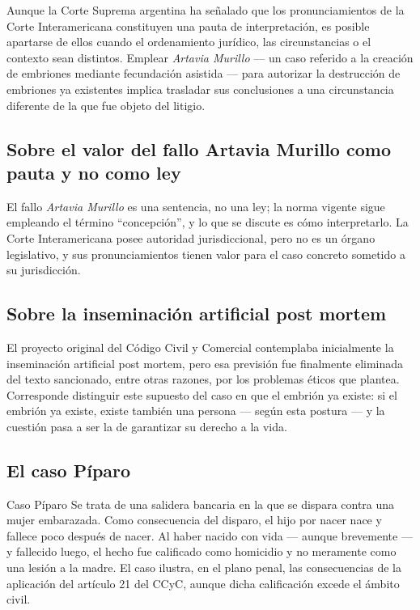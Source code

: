 \documentclass[12pt,oneside]{book}
\begin{document}
\begin{important}
Aunque la Corte Suprema argentina ha señalado que los pronunciamientos de la Corte Interamericana constituyen una pauta de interpretación, es posible apartarse de ellos cuando el ordenamiento jurídico, las circunstancias o el contexto sean distintos. Emplear \textit{Artavia Murillo} --- un caso referido a la creación de embriones mediante fecundación asistida --- para autorizar la destrucción de embriones ya existentes implica trasladar sus conclusiones a una circunstancia diferente de la que fue objeto del litigio.
\end{important}

\subsection{Sobre el valor del fallo Artavia Murillo como pauta y no como ley}

El fallo \textit{Artavia Murillo} es una sentencia, no una ley; la norma vigente sigue empleando el término ``concepción'', y lo que se discute es cómo interpretarlo. La Corte Interamericana posee autoridad jurisdiccional, pero no es un órgano legislativo, y sus pronunciamientos tienen valor para el caso concreto sometido a su jurisdicción.

\subsection{Sobre la inseminación artificial post mortem}

El proyecto original del Código Civil y Comercial contemplaba inicialmente la inseminación artificial post mortem, pero esa previsión fue finalmente eliminada del texto sancionado, entre otras razones, por los problemas éticos que plantea. Corresponde distinguir este supuesto del caso en que el embrión ya existe: si el embrión ya existe, existe también una persona --- según esta postura --- y la cuestión pasa a ser la de garantizar su derecho a la vida.

\subsection{El caso Píparo}

\begin{example}{Caso Píparo}
Se trata de una salidera bancaria en la que se dispara contra una mujer embarazada. Como consecuencia del disparo, el hijo por nacer nace y fallece poco después de nacer. Al haber nacido con vida --- aunque brevemente --- y fallecido luego, el hecho fue calificado como homicidio y no meramente como una lesión a la madre. El caso ilustra, en el plano penal, las consecuencias de la aplicación del artículo 21 del CCyC, aunque dicha calificación excede el ámbito civil.
\end{example}
\end{document}
